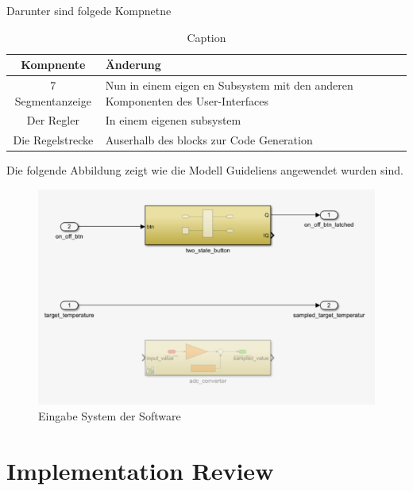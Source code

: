 \documentclass[a4paper,12pt]{article}
\begin{document}
	Darunter sind folgede Kompnetne
	
	\begin{table}
		\centering
		\begin{tabular}{|c|l|} \hline 
			\textbf{Kompnente}& \textbf{Änderung}\\ \hline 
			7 Segmentanzeige& Nun in einem eigen en Subsystem mit den anderen Komponenten des User-Interfaces\\ \hline 
			Der Regler&  In einem eigenen subsystem\\ \hline 
			Die Regelstrecke& Auserhalb des blocks zur Code Generation\\ \hline
		\end{tabular}
		\caption{Caption}
		\label{tab:my_label}
	\end{table}
	
	Die folgende Abbildung zeigt wie die Modell Guideliens angewendet wurden sind.

\begin{figure}[h!]
	\centering
	\includegraphics[width=\textwidth]{input_system.png}
	\caption{Eingabe System der Software}
\end{figure}











\section{Implementation Review}
\end{document}

